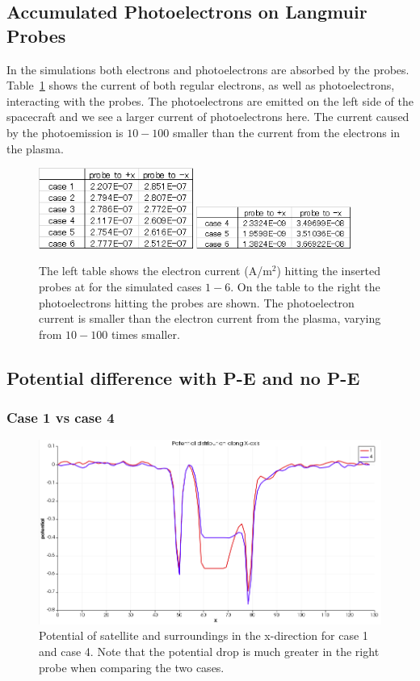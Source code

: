 \subsection{Accumulated Photoelectrons on Langmuir Probes}
\label{sec:acc_emitted}

In the simulations both electrons and photoelectrons are absorbed by the probes. Table~\ref{tab:elec_current} shows the current
of both regular electrons, as well as photoelectrons, interacting with the probes.
The photoelectrons are emitted on the left side of the spacecraft and we see a larger current of
photoelectrons here. The current caused by the photoemission is \(10-100\) smaller than the current
from the electrons in the plasma.

\begin{figure}[h]
	\includegraphics[width = 0.45\textwidth]{images/caliculation_of_electron_current}
	\includegraphics[width = 0.45\textwidth]{images/caliculation_of_PE_current}
	\caption{The left table shows the electron current (A/m\(^2\)) hitting the inserted probes at
	for the simulated cases \(1-6\). On the table to the right the photoelectrons hitting the probes are shown.
	The photoelectron current is smaller than the electron current from the plasma, varying from \(10-100\) times smaller.}
	\label{tab:elec_current}
\end{figure}

\subsection{Potential difference with P-E and no P-E}

\subsubsection{Case 1 vs case 4}

\begin{figure}
    \centering
    \includegraphics[width = 0.6 \textwidth]{images/pot_case14.png}
    \caption{Potential of satellite and surroundings in the x-direction for case 1 and case 4. Note that the potential drop is much greater in the right probe when comparing the two cases.}
    \label{fig:pot_case14}
\end{figure}


